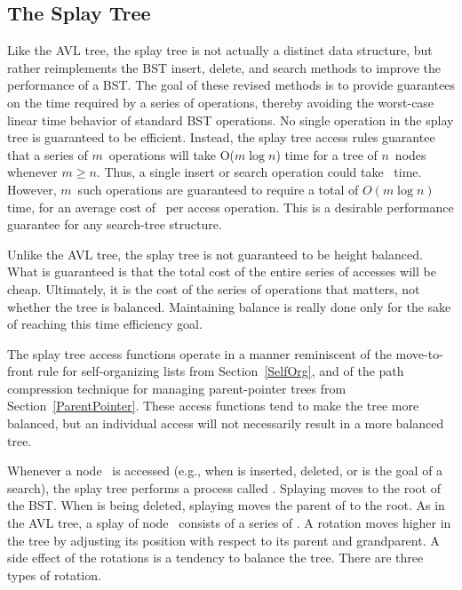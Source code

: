 \subsection{The Splay Tree}
\label{Splaysec}

Like the AVL tree, the splay tree is not
actually a distinct data structure, but rather reimplements the BST
insert, delete, and search methods to improve the performance of a
BST.
The goal of these revised methods is to provide guarantees on the time
required by a series of operations, thereby avoiding the worst-case
linear time behavior of standard BST operations.
No single operation in the splay tree is guaranteed to be efficient.
Instead, the splay tree access rules guarantee that a series of
$m$~operations will take O($m \log n$) time for a tree of $n$~nodes
whenever $m \geq n$.
Thus, a single insert or search operation could take \On\ time.
However, $m$~such operations are guaranteed to require a total
of $O(m \log n)$ time, for an average cost of
\Ologn\ per access operation.
This is a desirable performance guarantee for any search-tree
structure.

Unlike the AVL tree, the splay
tree is not guaranteed to be height balanced.
What is guaranteed is that the total cost of the entire series of
accesses will be cheap.
Ultimately, it is the cost of the series of operations that matters,
not whether the tree is balanced.
Maintaining balance is really done only for the sake of reaching this
time efficiency goal.

The splay tree access functions operate in a manner reminiscent of
the move-to-front rule for self-organizing lists
from
Section~\ref{SelfOrg}, and of the path compression technique for
managing
parent-pointer
trees from Section~\ref{ParentPointer}.
These access functions tend to make the tree more balanced, but an
individual access will not necessarily result in a more balanced tree.

Whenever a node~ is accessed (e.g., when  is
inserted, deleted, or is the goal of a search), the splay tree
performs a process called .
Splaying moves  to the root of the BST.
When  is being deleted, splaying
moves the parent of  to the root.
As in the AVL tree, a splay of node~
consists of a series of
.
A rotation moves  higher in the tree
by adjusting its position with respect to its parent and grandparent.
A side effect of the rotations is a tendency to balance the tree.
There are three types of rotation.

